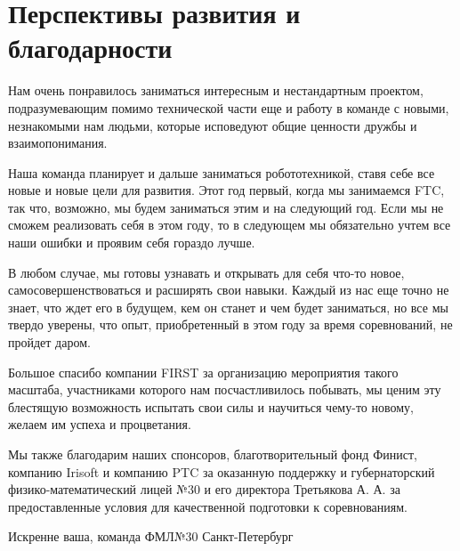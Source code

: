 
\section{Перспективы развития и благодарности}
    Нам очень понравилось заниматься интересным и нестандартным проектом, подразумевающим помимо технической части еще и работу в команде с новыми, незнакомыми нам людьми, которые исповедуют общие ценности дружбы и взаимопонимания.
    
    Наша команда планирует и дальше заниматься робототехникой, ставя себе все новые и новые цели для развития. Этот год первый, когда мы занимаемся FTC, так что, возможно, мы будем заниматься этим и на следующий год. Если мы не сможем реализовать себя в этом году, то в следующем мы обязательно учтем все наши ошибки и проявим себя гораздо лучше.
    
    В любом случае, мы готовы узнавать и открывать для себя что-то новое, самосовершенствоваться и расширять свои навыки.
     Каждый из нас еще точно не знает, что ждет его в будущем, кем он станет и чем будет заниматься, но все мы твердо уверены, что опыт, приобретенный в этом году за время соревнований, не пройдет даром.
    
    Большое спасибо компании FIRST за организацию мероприятия такого масштаба, участниками которого нам посчастливилось побывать, мы ценим эту блестящую возможность испытать свои силы и научиться чему-то новому, желаем им успеха и процветания.
    
    Мы также благодарим наших спонсоров, благотворительный фонд Финист, компанию Irisoft и компанию PTC за оказанную поддержку и губернаторский физико-математический лицей №30 и его директора Третьякова А. А. за предоставленные условия для качественной подготовки к соревнованиям.
    
    \begin{center}
      Искренне ваша, команда ФМЛ№30 Санкт-Петербург
    \end{center}
    
    \vspace{0.5em}
    
